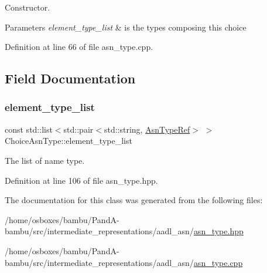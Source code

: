 Constructor. 


\begin{DoxyParams}{Parameters}
{\em element\+\_\+type\+\_\+list} & is the types composing this choice \\
\hline
\end{DoxyParams}


Definition at line 66 of file asn\+\_\+type.\+cpp.



\subsection{Field Documentation}
\mbox{\label{classChoiceAsnType_aa7f41981d0f8263299a5c829e0737981}} 
\subsubsection{\texorpdfstring{element\+\_\+type\+\_\+list}{element\_type\_list}}
{\footnotesize\ttfamily const std\+::list$<$std\+::pair$<$std\+::string, \hyperlink{asn__type_8hpp_a456d7cf50c15d087cc0428ae80834b35}{Asn\+Type\+Ref}$>$ $>$ Choice\+Asn\+Type\+::element\+\_\+type\+\_\+list}



The list of name type. 



Definition at line 106 of file asn\+\_\+type.\+hpp.



The documentation for this class was generated from the following files\+:\begin{DoxyCompactItemize}
\item 
/home/osboxes/bambu/\+Pand\+A-\/bambu/src/intermediate\+\_\+representations/aadl\+\_\+asn/\hyperlink{asn__type_8hpp}{asn\+\_\+type.\+hpp}\item 
/home/osboxes/bambu/\+Pand\+A-\/bambu/src/intermediate\+\_\+representations/aadl\+\_\+asn/\hyperlink{asn__type_8cpp}{asn\+\_\+type.\+cpp}\end{DoxyCompactItemize}
